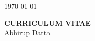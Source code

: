 \documentclass[12pt]{article}
\begin{document}
\hfill \today

\begin{center}
{\bf CURRICULUM VITAE }\\
Abhirup Datta\\[3mm]
\end{center}

%
%
%
\end{document}
